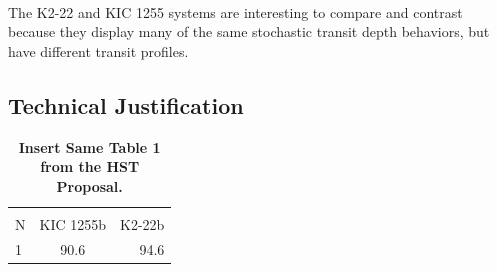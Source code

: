 \documentclass[letterpaper,12pt]{article}
\begin{document}
\\

The K2-22 and KIC 1255 systems are interesting to compare and contrast because they display many of the same stochastic transit depth behaviors, but have different transit profiles.



%
%
%
%
%

\clearpage

\subsection{Technical Justification}

\begin{table}[htbp]
   \centering
   \begin{tabular}{@{} lcr @{}} %
      \multicolumn{2}{c}{} \\
      N   & KIC 1255b & K2-22b \\
      \hline
      1      & 90.6 & 94.6 \\
   \end{tabular}
   \caption{\textbf{Insert Same Table 1 from the HST Proposal.}}
   \label{tab:probabilities}
\end{table}
\end{document}
